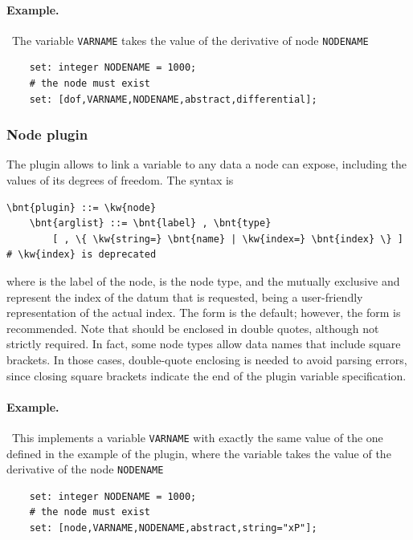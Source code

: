\paragraph{Example.} \
The variable \texttt{VARNAME} takes the value of the derivative
of  node \texttt{NODENAME}
\begin{verbatim}
    set: integer NODENAME = 1000;
    # the node must exist
    set: [dof,VARNAME,NODENAME,abstract,differential];
\end{verbatim}



\subsubsection{Node plugin}
The  plugin allows to link a variable to any data a node
can expose, including the values of its degrees of freedom.
The syntax is
\begin{Verbatim}[commandchars=\\\{\}]
    \bnt{plugin} ::= \kw{node}
    \bnt{arglist} ::= \bnt{label} , \bnt{type}
        [ , \{ \kw{string=} \bnt{name} | \kw{index=} \bnt{index} \} ] # \kw{index} is deprecated
\end{Verbatim}
where
 is the label of the node,
 is the node type,
and the mutually exclusive  and  represent the index
of the datum that is requested, \nt{name} being a user-friendly
representation of the actual index.
The  form is the default; however, the  form is recommended.
Note that \nt{name} should be enclosed in double quotes,
although not strictly required.
In fact, some node types allow data names that include square brackets.
In those cases, double-quote enclosing is needed to avoid parsing errors,
since closing square brackets indicate the end
of the plugin variable specification.

\paragraph{Example.} \
This implements a variable \texttt{VARNAME} with exactly the same value
of the one defined in the example of the  plugin,
where the variable takes the value of the derivative
of the \kw{abstract} node \texttt{NODENAME}
\begin{verbatim}
    set: integer NODENAME = 1000;
    # the node must exist
    set: [node,VARNAME,NODENAME,abstract,string="xP"];
\end{verbatim}



